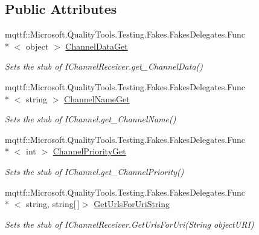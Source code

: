 \subsection*{Public Attributes}
\begin{DoxyCompactItemize}
\item 
mqttf\-::\-Microsoft.\-Quality\-Tools.\-Testing.\-Fakes.\-Fakes\-Delegates.\-Func\\*
$<$ object $>$ \hyperlink{class_system_1_1_runtime_1_1_remoting_1_1_channels_1_1_fakes_1_1_stub_i_channel_receiver_a18a21b9429314f1267770e32ae0f15a1}{Channel\-Data\-Get}
\begin{DoxyCompactList}\small\item\em Sets the stub of I\-Channel\-Receiver.\-get\-\_\-\-Channel\-Data()\end{DoxyCompactList}\item 
mqttf\-::\-Microsoft.\-Quality\-Tools.\-Testing.\-Fakes.\-Fakes\-Delegates.\-Func\\*
$<$ string $>$ \hyperlink{class_system_1_1_runtime_1_1_remoting_1_1_channels_1_1_fakes_1_1_stub_i_channel_receiver_af4582da4a377f30ef3e9bb4ad88da489}{Channel\-Name\-Get}
\begin{DoxyCompactList}\small\item\em Sets the stub of I\-Channel.\-get\-\_\-\-Channel\-Name()\end{DoxyCompactList}\item 
mqttf\-::\-Microsoft.\-Quality\-Tools.\-Testing.\-Fakes.\-Fakes\-Delegates.\-Func\\*
$<$ int $>$ \hyperlink{class_system_1_1_runtime_1_1_remoting_1_1_channels_1_1_fakes_1_1_stub_i_channel_receiver_abacac5b46911ada670b855466b9cfbaa}{Channel\-Priority\-Get}
\begin{DoxyCompactList}\small\item\em Sets the stub of I\-Channel.\-get\-\_\-\-Channel\-Priority()\end{DoxyCompactList}\item 
mqttf\-::\-Microsoft.\-Quality\-Tools.\-Testing.\-Fakes.\-Fakes\-Delegates.\-Func\\*
$<$ string, string\mbox{[}$\,$\mbox{]}$>$ \hyperlink{class_system_1_1_runtime_1_1_remoting_1_1_channels_1_1_fakes_1_1_stub_i_channel_receiver_a2f132dd7096ebca0fdd0f113e1c4c391}{Get\-Urls\-For\-Uri\-String}
\begin{DoxyCompactList}\small\item\em Sets the stub of I\-Channel\-Receiver.\-Get\-Urls\-For\-Uri(\-String object\-U\-R\-I)\end{DoxyCompactList}\item 

\end{DoxyCompactItemize}
